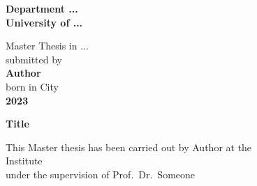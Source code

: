 
\begin{titlepage}
\begin{center}
 
\Large\textbf{Department ...\\
University of ...}

\vspace{18cm}

\normalsize
Master Thesis in ...\\
submitted by\\
\vspace{0.5cm}
\Large\textbf{Author}\\
\normalsize
\vspace{0.5cm}
born in City\\
\vspace{0.5cm}
\Large\textbf{2023}
\normalsize

\newpage
\thispagestyle{empty}


\Large\textbf{Title}

\vspace{18cm}

\normalsize
This Master thesis has been carried out by Author at the\\
Institute\\
under the supervision of Prof.\ Dr.\ Someone

\vfill
\end{center}

\end{titlepage}
